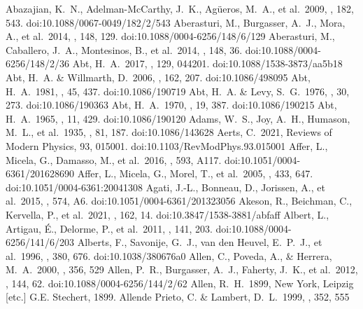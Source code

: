 \documentclass[twocolumn,tighten,twocolappendix]{aastex631}
\begin{document}
\begin{thebibliography}{}
 Abazajian, K.~N., Adelman-McCarthy, J.~K., Ag{\"u}eros, M.~A., et al.\ 2009, \apjs, 182, 543. doi:10.1088/0067-0049/182/2/543
 Aberasturi, M., Burgasser, A.~J., Mora, A., et al.\ 2014, \aj, 148, 129. doi:10.1088/0004-6256/148/6/129
 Aberasturi, M., Caballero, J.~A., Montesinos, B., et al.\ 2014, \aj, 148, 36. doi:10.1088/0004-6256/148/2/36
 Abt, H.~A.\ 2017, \pasp, 129, 044201. doi:10.1088/1538-3873/aa5b18
 Abt, H.~A. \& Willmarth, D.\ 2006, \apjs, 162, 207. doi:10.1086/498095
 Abt, H.~A.\ 1981, \apjs, 45, 437. doi:10.1086/190719
 Abt, H.~A. \& Levy, S.~G.\ 1976, \apjs, 30, 273. doi:10.1086/190363
 Abt, H.~A.\ 1970, \apjs, 19, 387. doi:10.1086/190215
 Abt, H.~A.\ 1965, \apjs, 11, 429. doi:10.1086/190120
 Adams, W.~S., Joy, A.~H., Humason, M.~L., et al.\ 1935, \apj, 81, 187. doi:10.1086/143628
 Aerts, C.\ 2021, Reviews of Modern Physics, 93, 015001. doi:10.1103/RevModPhys.93.015001
 Affer, L., Micela, G., Damasso, M., et al.\ 2016, \aap, 593, A117. doi:10.1051/0004-6361/201628690
 Affer, L., Micela, G., Morel, T., et al.\ 2005, \aap, 433, 647. doi:10.1051/0004-6361:20041308
 Agati, J.-L., Bonneau, D., Jorissen, A., et al.\ 2015, \aap, 574, A6. doi:10.1051/0004-6361/201323056
 Akeson, R., Beichman, C., Kervella, P., et al.\ 2021, \aj, 162, 14. doi:10.3847/1538-3881/abfaff
 Albert, L., Artigau, {\'E}., Delorme, P., et al.\ 2011, \aj, 141, 203. doi:10.1088/0004-6256/141/6/203
 Alberts, F., Savonije, G.~J., van den Heuvel, E.~P.~J., et al.\ 1996, \nat, 380, 676. doi:10.1038/380676a0
 Allen, C., Poveda, A., \& Herrera, M.~A.\ 2000, \aap, 356, 529
 Allen, P.~R., Burgasser, A.~J., Faherty, J.~K., et al.\ 2012, \aj, 144, 62. doi:10.1088/0004-6256/144/2/62
 Allen, R.~H.\ 1899, New York, Leipzig [etc.] G.E. Stechert, 1899.
 Allende Prieto, C. \& Lambert, D.~L.\ 1999, \aap, 352, 555

\end{thebibliography}
\end{document}
